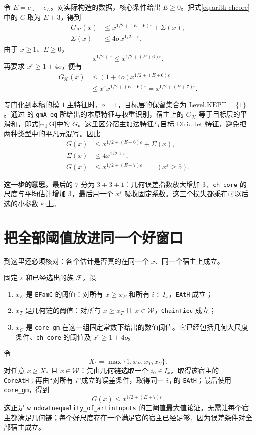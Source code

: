 \documentclass[UTF8,fontset=fandol,a4paper,openany,oneside]{ctexbook}
\theoremstyle{definition}
\theoremstyle{remark}
\newcommand{\Expl}[1]{\par\smallskip\noindent\textbf{这一步的意思。}#1\par\smallskip}
\begin{document}
令 $E=e_D+e_L$。对实际构造的数据，核心条件给出 $E\ge0$。把式\eqref{eq:arith-chcore}中的 $C$ 取为 $E+3$，得到
\begin{align}
G_{\mathcal K}(x)&\le x^{1/2+(E+6)\varepsilon}+\Sigma(x),\label{eq:arith-main-general}\\
\Sigma(x)&\le4o\,x^{1/2+\varepsilon}.
\end{align}
由于 $x\ge1$、$E\ge0$，
\[
x^{1/2+\varepsilon}\le x^{1/2+(E+6)\varepsilon}.
\]
再要求 $x^\varepsilon\ge1+4o$，便有
\begin{align*}
G_{\mathcal K}(x)
&\le(1+4o)x^{1/2+(E+6)\varepsilon}\\
&\le x^\varepsilon x^{1/2+(E+6)\varepsilon}
=x^{1/2+(E+7)\varepsilon}.
\end{align*}

专门化到本稿的模 $1$ 主特征时，$o=1$，目标层的保留集合为 $\mathrm{Level.KEPT}=\{1\}$。通过  的 \texttt{gmA\_eq} 所给出的本原特征与权重识别，宿主上的 $G_{\mathcal K}$ 等于目标层的平滑和，即式\eqref{eq:G}中的 $G$。这里区分宿主加法特征与目标 Dirichlet 特征，避免把两种类型中的平凡元混写。因此
\begin{align}
G(x)&\le x^{1/2+(E+6)\varepsilon}+\Sigma(x),\label{eq:arith-main}\\
\Sigma(x)&\le4x^{1/2+\varepsilon},\label{eq:arith-error}\\
G(x)&\le x^{1/2+(E+7)\varepsilon}\qquad(x^\varepsilon\ge5).
\label{eq:arith-final-numeric}
\end{align}

\Expl{最后的 $7$ 分为 $3+3+1$：几何误差指数放大增加 $3$，\texttt{ch\_core} 的尺度与平均估计增加 $3$，最后用一个 $x^\varepsilon$ 吸收固定系数。这三个损失都乘在可以后选的小参数 $\varepsilon$ 上。}

\section{把全部阈值放进同一个好窗口}
\label{sec:arith-thresholds}
到这里还必须核对：各个估计是否真的在同一个 $x$、同一个宿主上成立。

固定 $\varepsilon$ 和已经选出的族 $\mathcal F$。设
\begin{enumerate}
\item $x_E$ 是 \texttt{EFamC} 的阈值：对所有 $x\ge x_E$ 和所有 $i\in I_x$，\texttt{EAtH} 成立；
\item $x_T$ 是几何链的阈值：对所有 $x\ge x_T$ 且 $x\in\mathcal W$，\texttt{ChainTied} 成立；
\item $x_C$ 是 \texttt{core\_gm} 在这一组固定常数下给出的数值阈值。它已经包括几何大尺度条件、\texttt{ch\_core} 的阈值及 $x^\varepsilon\ge1+4o$。
\end{enumerate}
令
\[
X_* = \max\{1,x_E,x_T,x_C\}.
\]
对任意 $x\ge X_*$ 且 $x\in\mathcal W$：先由几何链选取一个 $i_0\in I_x$，取得该宿主的 \texttt{CoreAtH}；再由“对所有 $i$”成立的误差条件，取得同一 $i_0$ 的 \texttt{EAtH}；最后使用 \texttt{core\_gm}，得到
\[
G(x)\le x^{1/2+(E+7)\varepsilon}.
\]
这正是 \texttt{windowInequality\_of\_artinInputs} 的三阈值最大值论证。无需让每个宿主都满足几何链；每个好尺度存在一个满足它的宿主已经足够，因为误差条件对全部宿主成立。
\end{document}
